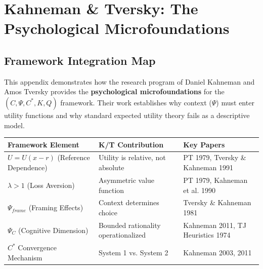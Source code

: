 \section{Kahneman \& Tversky: The Psychological Microfoundations}
\label{app:kahneman-tversky}

\subsection{Framework Integration Map}

This appendix demonstrates how the research program of Daniel Kahneman and 
Amos Tversky provides the \textbf{psychological microfoundations} for the 
$(C, \Psi, C^*, K, Q)$ framework. Their work establishes why context ($\Psi$) 
must enter utility functions and why standard expected utility theory fails 
as a descriptive model.

\begin{center}
\renewcommand{\arraystretch}{1.4}
\begin{tabular}{|l|l|l|}
\hline
\textbf{Framework Element} & \textbf{K/T Contribution} & \textbf{Key Papers} \\
\hline
$U = U(x - r)$ (Reference Dependence) & Utility is relative, not absolute & PT 1979, Tversky \& Kahneman 1991 \\
$\lambda > 1$ (Loss Aversion) & Asymmetric value function & PT 1979, Kahneman et al. 1990 \\
$\Psi_{frame}$ (Framing Effects) & Context determines choice & Tversky \& Kahneman 1981 \\
$\Psi_C$ (Cognitive Dimension) & Bounded rationality operationalized & Kahneman 2011, TJ Heuristics 1974 \\
$C^*$ Convergence Mechanism & System 1 vs. System 2 & Kahneman 2003, 2011 \\
\hline
\end{tabular}
\end{center}

